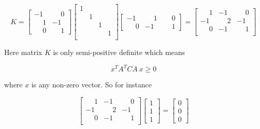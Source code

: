 \begin{equation*}
K =
\begin{bmatrix}
            -1 & \phantom{-}0 \\
  \phantom{-}1 & -1 \\
  \phantom{-}0 & \phantom{-}1
\end{bmatrix}
\begin{bmatrix}
 1 &   &   &   \\
   & 1 &   &   \\
   &   & 1 &   \\
   &   &   & 1 \\
\end{bmatrix}
\begin{bmatrix}
           -1 & \phantom{-}1 & \phantom{-}0 \\
 \phantom{-}0 &           -1 & \phantom{-}1 
\end{bmatrix}
= 
\begin{bmatrix}
 \phantom{-}1 &           -1 & \phantom{-}0 \\
           -1 & \phantom{-}2 &           -1 \\
 \phantom{-}0 &           -1 & \phantom{-}1 \\
\end{bmatrix}
\end{equation*}

Here matrix $K$ is only semi-positive definite which means 

\begin{equation}
\label{eq:semi_pos_definite}
x^T A^T C A \ x \geq 0 
\end{equation}

where $x$ is any non-zero vector. So for instance

\begin{equation*}
\begin{bmatrix}
 \phantom{-}1 &           -1 & \phantom{-}0 \\
           -1 & \phantom{-}2 &           -1 \\
 \phantom{-}0 &           -1 & \phantom{-}1 \\
\end{bmatrix}
\begin{bmatrix}
 1 \\ 1 \\ 1 
\end{bmatrix}
= 
\begin{bmatrix}
 0 \\ 0 \\ 0 
\end{bmatrix}
\end{equation*}

